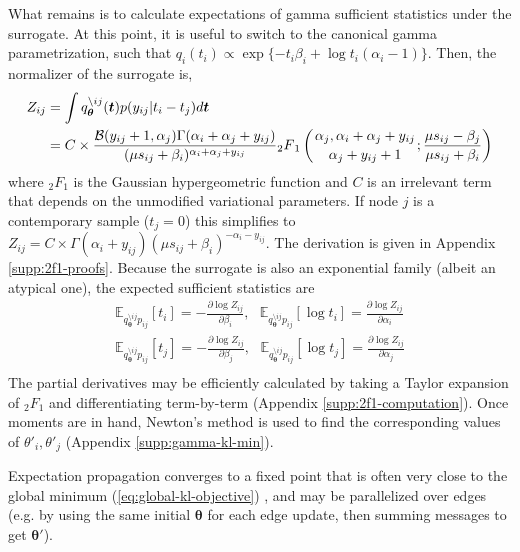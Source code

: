 \documentclass{article}
\begin{document}
What remains is to calculate expectations of gamma sufficient statistics under the surrogate. At this point, it is useful to switch to the canonical gamma parametrization, such that $q_{i}(t_i) \propto \exp \{ -t_i \beta_i + \log t_i (\alpha_i - 1) \}$. Then, the normalizer of the surrogate is,
\[
\begin{aligned}
Z_{ij} & = \int q^{\setminus ij}_{\bm \theta}(\bm t) p(y_{ij} | t_i - t_j) d\bm t \\
& = C \times \frac{\mathcal{B}(y_{ij} + 1, \alpha_j) \Gamma(\alpha_i + \alpha_j + y_{ij})}{(\mu s_{ij} + \beta_i)^{\alpha_i + \alpha_j + y_{ij}}} {_2}F{_1}\left( {{\alpha_j,  \alpha_i + \alpha_j + y_{ij} } \atop {\alpha_j + y_{ij} + 1}}; \frac{\mu s_{ij} - \beta_j}{\mu s_{ij} + \beta_i} \right)
\end{aligned}
\]
where ${_2}F{_1}$ is the Gaussian hypergeometric function and $C$ is an irrelevant term that depends on the unmodified variational parameters. If node $j$ is a contemporary sample ($t_j = 0$) this simplifies to $Z_{ij} = C \times \Gamma(\alpha_i + y_{ij}) (\mu s_{ij} + \beta_i)^{-\alpha_i - y_{ij}}$. The derivation is given in Appendix \ref{supp:2f1-proofs}. Because the surrogate is also an exponential family (albeit an atypical one), the expected sufficient statistics are
\[
\begin{aligned}
\mathbb{E}_{q^{\setminus ij}_{\bm \theta} p_{ij}}[t_i] = -\frac{\partial \log Z_{ij}}{\partial \beta_i},~~~ \mathbb{E}_{q^{\setminus ij}_{\bm \theta} p_{ij}}[\log t_i] = \frac{\partial \log Z_{ij}}{\partial \alpha_i} \\
\mathbb{E}_{q^{\setminus ij}_{\bm \theta} p_{ij}}[t_j] = -\frac{\partial \log Z_{ij}}{\partial \beta_j},~~~ \mathbb{E}_{q^{\setminus ij}_{\bm \theta} p_{ij}}[\log t_j] = \frac{\partial \log Z_{ij}}{\partial \alpha_j} \\
\end{aligned}
\] 
The partial derivatives may be efficiently calculated by taking a Taylor expansion of ${_2}F{_1}$ and differentiating term-by-term (Appendix \ref{supp:2f1-computation}). Once moments are in hand, Newton's method is used to find the corresponding values of $\theta'_i, \theta'_j$ (Appendix \ref{supp:gamma-kl-min}).

Expectation propagation converges to a fixed point that is often very close to the global minimum (\ref{eq:global-kl-objective}) \cite{cunningham2014gaussian}, and may be parallelized over edges (e.g. by using the same initial $\bm \theta$ for each edge update, then summing messages to get $\bm \theta'$).
\end{document}
